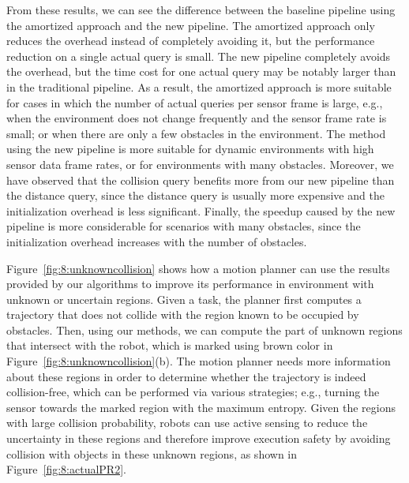 From these results, we can see the difference between the baseline pipeline using the amortized approach and the new pipeline. The amortized approach
only reduces the overhead instead of completely avoiding it, but the
performance reduction on a single actual query is small. The new pipeline completely avoids the overhead, but the time
cost for one actual query may be notably larger than in the traditional
pipeline. As a result, the amortized approach is more suitable for
cases in which the number of actual queries per sensor frame is large,
e.g., when the environment does not change frequently and the sensor frame rate is
small; or when there are only a few obstacles in the environment. The
method using the new pipeline is more suitable for dynamic
environments with high sensor data frame rates, or for environments with
many obstacles. Moreover, we have observed that the collision query benefits more from our new pipeline than the distance query, since the distance query is usually more expensive and the initialization overhead is less significant. Finally, the speedup caused by the new pipeline is more considerable for scenarios with many obstacles, since the initialization overhead increases with the number of obstacles.

Figure~\ref{fig:8:unknowncollision} shows how a motion planner can use the results provided by our algorithms to improve its performance in environment with unknown or uncertain regions. Given a task, the planner first computes a trajectory that does not collide with the region known to be occupied by obstacles. Then, using our methods, we can compute the part of unknown regions that intersect with the robot, which is marked using brown color in Figure~\ref{fig:8:unknowncollision}(b). The motion planner needs more information about these regions in order to determine whether the trajectory is indeed collision-free, which can be performed via various strategies; e.g., turning the sensor towards the marked region with the maximum entropy. Given the regions with large collision probability, robots can use active sensing to reduce the uncertainty in these regions and therefore improve execution safety by avoiding collision with objects in these unknown regions, as shown in Figure~\ref{fig:8:actualPR2}.

